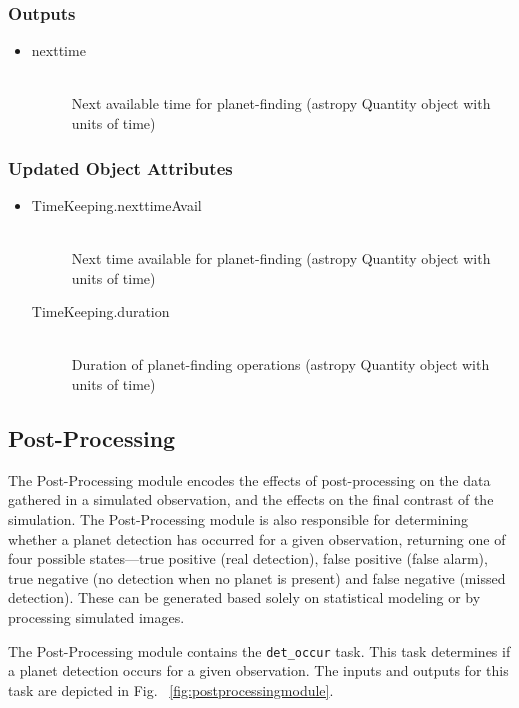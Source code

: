 \documentclass[cleanfoot]{asme2ej}
\begin{document}
\subsubsection*{Outputs}
\begin{itemize}
    \item 
    \begin{description}
        \item[nexttime] \hfill \\
        Next available time for planet-finding (astropy Quantity object with units of time)
    \end{description}
\end{itemize}

\subsubsection*{Updated Object Attributes}
\begin{itemize}
    \item 
    \begin{description}
        \item[TimeKeeping.nexttimeAvail] \hfill \\
        Next time available for planet-finding (astropy Quantity object with units of time)
        \item[TimeKeeping.duration] \hfill \\
        Duration of planet-finding operations (astropy Quantity object with units of time)
    \end{description}
\end{itemize}


\subsection{Post-Processing}\label{sec:postprocessing}
The Post-Processing module encodes the effects of post-processing on the data gathered in a simulated observation, and the effects on the final contrast of the simulation.  The Post-Processing module is also responsible for determining whether a planet detection has occurred for a given observation, returning one of four possible states---true positive (real detection), false positive (false alarm), true negative (no detection when no planet is present) and false negative (missed detection).  These can be generated based solely on statistical modeling or by processing simulated images.

The Post-Processing module contains the \verb+det_occur+ task.  This task determines if a planet detection occurs for a given observation.  The inputs and outputs for this task are depicted in Fig. ~\ref{fig:postprocessingmodule}.
\end{document}
